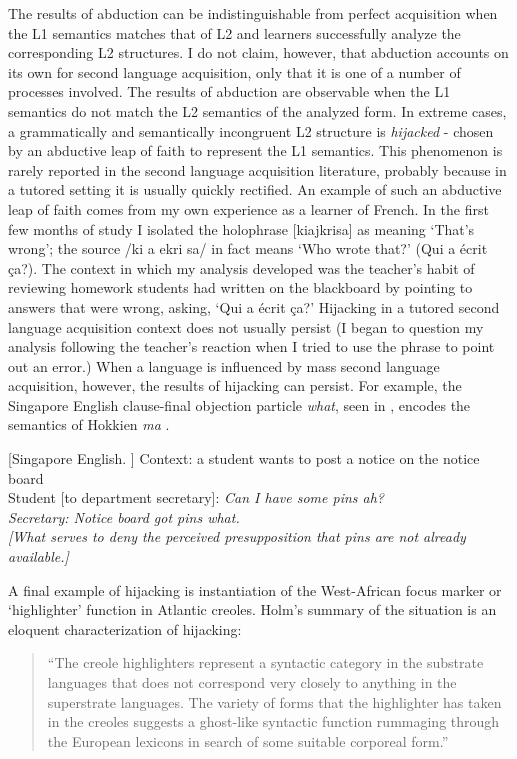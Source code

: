 The results of abduction can be indistinguishable from perfect acquisition when the L1 semantics matches that of L2 and learners successfully analyze the corresponding L2 structures. I do not claim, however, that abduction accounts on its own for second language acquisition, only that it is one of a number of processes involved. The results of abduction are observable when the L1 semantics do not match the L2 semantics of the analyzed form. In extreme cases, a grammatically and semantically incongruent L2 structure is \textit{hijacked} - chosen by an abductive leap of faith to represent the L1 semantics. This phenomenon is rarely reported in the second language acquisition literature, probably because in a tutored setting it is usually quickly rectified. An example of such an abductive leap of faith comes from my own experience as a learner of French. In the first few months of study I isolated the holophrase [{\textsecstress}kiaj{\textprimstress}krisa] as meaning `That's wrong'; the source /ki a ekri {\textprimstress}sa/ in fact means `Who wrote that?' (Qui a écrit \c{c}a?). The context in which my analysis developed was the teacher's habit of reviewing homework students had written on the blackboard by pointing to answers that were wrong, asking, `Qui a écrit \c{c}a?' Hijacking in a tutored second language acquisition context does not usually persist (I began to question my analysis following the teacher's reaction when I tried to use the phrase to point out an error.) When a language is influenced by mass second language acquisition, however, the results of hijacking can persist. For example, the Singapore English clause-final objection particle \textit{what}, seen in , encodes the semantics of Hokkien \textit{ma} \citep{Smith1985multi}.

\ea\label{smith:ex:1}
{}[Singapore English. \citep[111]{Smith1985multi}]
Context: a student wants to post a notice on the notice board\\
 Student [to department secretary]: \em Can I have some pins ah? \em \\
 Secretary: \em Notice board got pins what.\em \\
{}[\textit{What} serves to deny the perceived presupposition that pins are not already available.] 
\z

A final example of hijacking is instantiation of the West-African focus marker or `highlighter' function in Atlantic creoles. Holm's summary of the situation is an eloquent characterization of hijacking: 

\begin{quote}
``The creole highlighters represent a syntactic category in the substrate languages that does not correspond very closely to anything in the superstrate languages. The variety of forms that the highlighter has taken in the creoles suggests a ghost-like syntactic function rummaging through the European lexicons in search of some suitable corporeal form.'' \citep[203]{Holm2000}
\end{quote}

